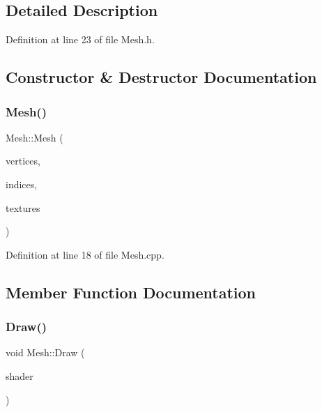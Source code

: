 \subsection{Detailed Description}


Definition at line 23 of file Mesh.\+h.



\subsection{Constructor \& Destructor Documentation}
\mbox{\label{classMesh_af1baf95f510199fd2b3631e9daae79ce}} 
\subsubsection{\texorpdfstring{Mesh()}{Mesh()}}
{\footnotesize\ttfamily Mesh\+::\+Mesh (\begin{DoxyParamCaption}\item[{std\+::vector$<$ \mbox{\hyperlink{structMesh_1_1Vertex}{Vertex}} $>$}]{vertices,  }\item[{std\+::vector$<$ G\+Luint $>$}]{indices,  }\item[{std\+::vector$<$ \mbox{\hyperlink{structMesh_1_1Texture}{Texture}} $>$}]{textures }\end{DoxyParamCaption})}



Definition at line 18 of file Mesh.\+cpp.



\subsection{Member Function Documentation}
\mbox{\label{classMesh_a143c8d7c179801c6377853db26d4a19f}} 
\subsubsection{\texorpdfstring{Draw()}{Draw()}}
{\footnotesize\ttfamily void Mesh\+::\+Draw (\begin{DoxyParamCaption}\item[{\mbox{\hyperlink{classShader}{Shader}}}]{shader }\end{DoxyParamCaption})}



